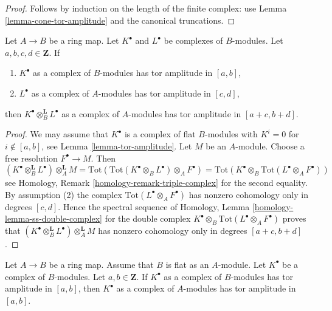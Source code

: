 \begin{proof}
Follows by induction on the length of the finite complex: use
Lemma \ref{lemma-cone-tor-amplitude}
and the canonical truncations.
\end{proof}

\begin{lemma}
\label{lemma-push-tor-amplitude}
Let $A \to B$ be a ring map. Let $K^\bullet$ and $L^\bullet$ be complexes
of $B$-modules. Let $a, b, c, d \in \mathbf{Z}$. If
\begin{enumerate}
\item $K^\bullet$ as a complex of $B$-modules has tor amplitude in $[a, b]$,
\item $L^\bullet$ as a complex of $A$-modules has tor amplitude in $[c, d]$,
\end{enumerate}
then $K^\bullet \otimes^\mathbf{L}_B L^\bullet$ as a complex of $A$-modules
has tor amplitude in $[a + c, b + d]$.
\end{lemma}

\begin{proof}
We may assume that $K^\bullet$ is a complex of flat $B$-modules with $K^i = 0$
for $i \not \in [a, b]$, see Lemma \ref{lemma-tor-amplitude}.
Let $M$ be an $A$-module. Choose a free resolution $F^\bullet \to M$.
Then
$$
(K^\bullet \otimes_B^\mathbf{L} L^\bullet) \otimes_A^{\mathbf{L}} M =
\text{Tot}(\text{Tot}(K^\bullet \otimes_B L^\bullet) \otimes_A F^\bullet) =
\text{Tot}(K^\bullet \otimes_B \text{Tot}(L^\bullet \otimes_A F^\bullet))
$$
see Homology, Remark \ref{homology-remark-triple-complex} for the second
equality. By assumption (2) the complex
$\text{Tot}(L^\bullet \otimes_A F^\bullet)$
has nonzero cohomology only in degrees $[c, d]$. Hence the spectral sequence of
Homology, Lemma \ref{homology-lemma-ss-double-complex}
for the double complex
$K^\bullet \otimes_B \text{Tot}(L^\bullet \otimes_A F^\bullet)$
proves that
$(K^\bullet \otimes_B^\mathbf{L} L^\bullet) \otimes_A^{\mathbf{L}} M$
has nonzero cohomology only in degrees $[a + c, b + d]$.
\end{proof}

\begin{lemma}
\label{lemma-flat-push-tor-amplitude}
Let $A \to B$ be a ring map. Assume that $B$ is flat as an
$A$-module. Let $K^\bullet$ be a complex of $B$-modules.
Let $a, b \in \mathbf{Z}$. If $K^\bullet$ as a complex of $B$-modules
has tor amplitude in $[a, b]$, then $K^\bullet$ as a complex of
$A$-modules has tor amplitude in $[a, b]$.
\end{lemma}

